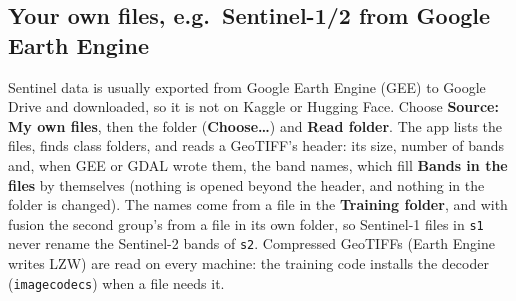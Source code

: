 \documentclass[11pt,a4paper]{article}
\newcommand{\ui}[1]{\textbf{\textsf{#1}}}
\newcommand{\file}[1]{\texttt{#1}}
\begin{document}
\subsection{Your own files, e.g.\ Sentinel-1/2 from Google Earth Engine}
\label{sec:own-files}
Sentinel data is usually exported from Google Earth Engine (GEE) to Google Drive and downloaded, so it is not on Kaggle or Hugging Face.
Choose \ui{Source: My own files}, then the folder (\ui{Choose\dots}) and \ui{Read folder}. The app lists the files, finds class folders,
and reads a GeoTIFF's header: its size, number of bands and, when GEE or GDAL wrote them, the band names, which fill
\ui{Bands in the files} by themselves (nothing is opened beyond the header, and nothing in the folder is changed). The names come from a
file in the \ui{Training folder}, and with fusion the second group's from a file in its own folder, so Sentinel-1 files in \file{s1}
never rename the Sentinel-2 bands of \file{s2}. Compressed GeoTIFFs (Earth Engine writes LZW) are read on every machine: the training
code installs the decoder (\texttt{imagecodecs}) when a file needs it.
\end{document}
